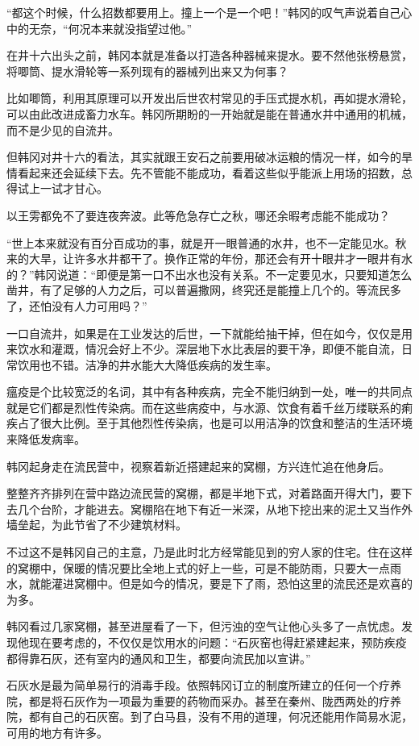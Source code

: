 “都这个时候，什么招数都要用上。撞上一个是一个吧！”韩冈的叹气声说着自己心中的无奈，“何况本来就没指望过他。”

在井十六出头之前，韩冈本就是准备以打造各种器械来提水。要不然他张榜悬赏，将唧筒、提水滑轮等一系列现有的器械列出来又为何事？

比如唧筒，利用其原理可以开发出后世农村常见的手压式提水机，再如提水滑轮，可以由此改进成畜力水车。韩冈所期盼的一开始就是能在普通水井中通用的机械，而不是少见的自流井。

但韩冈对井十六的看法，其实就跟王安石之前要用破冰运粮的情况一样，如今的旱情看起来还会延续下去。先不管能不能成功，看着这些似乎能派上用场的招数，总得试上一试才甘心。

以王雱都免不了要连夜奔波。此等危急存亡之秋，哪还余暇考虑能不能成功？

“世上本来就没有百分百成功的事，就是开一眼普通的水井，也不一定能见水。秋来的大旱，让许多水井都干了。换作正常的年份，那还会有开十眼井才一眼井有水的？”韩冈说道：“即便是第一口不出水也没有关系。不一定要见水，只要知道怎么凿井，有了足够的人力之后，可以普遍撒网，终究还是能撞上几个的。等流民多了，还怕没有人力可用吗？”

一口自流井，如果是在工业发达的后世，一下就能给抽干掉，但在如今，仅仅是用来饮水和灌溉，情况会好上不少。深层地下水比表层的要干净，即便不能自流，日常饮用也不错。洁净的井水能大大降低疾病的发生率。

瘟疫是个比较宽泛的名词，其中有各种疾病，完全不能归纳到一处，唯一的共同点就是它们都是烈性传染病。而在这些病疫中，与水源、饮食有着千丝万缕联系的痢疾占了很大比例。至于其他烈性传染病，也是可以用洁净的饮食和整洁的生活环境来降低发病率。

韩冈起身走在流民营中，视察着新近搭建起来的窝棚，方兴连忙追在他身后。

整整齐齐排列在营中路边流民营的窝棚，都是半地下式，对着路面开得大门，要下去几个台阶，才能进去。窝棚陷在地下有近一米深，从地下挖出来的泥土又当作外墙垒起，为此节省了不少建筑材料。

不过这不是韩冈自己的主意，乃是此时北方经常能见到的穷人家的住宅。住在这样的窝棚中，保暖的情况要比全地上式的好上一些，可是不能防雨，只要大一点雨水，就能灌进窝棚中。但是如今的情况，要是下了雨，恐怕这里的流民还是欢喜的为多。

韩冈看过几家窝棚，甚至进屋看了一下，但污浊的空气让他心头多了一点忧虑。发现他现在要考虑的，不仅仅是饮用水的问题：“石灰窑也得赶紧建起来，预防疾疫都得靠石灰，还有室内的通风和卫生，都要向流民加以宣讲。”

石灰水是最为简单易行的消毒手段。依照韩冈订立的制度所建立的任何一个疗养院，都是将石灰作为一项最为重要的药物而采办。甚至在秦州、陇西两处的疗养院，都有自己的石灰窑。到了白马县，没有不用的道理，何况还能用作简易水泥，可用的地方有许多。

